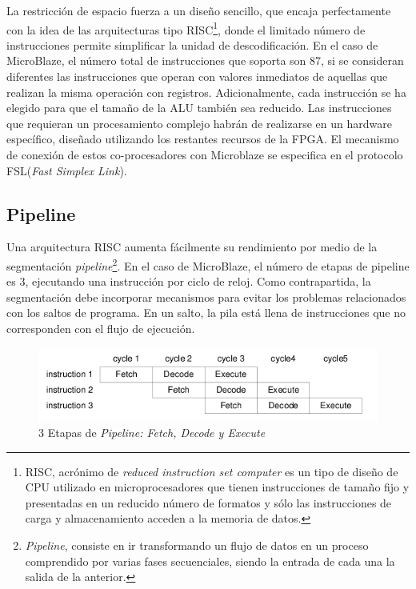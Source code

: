 La restricción de espacio fuerza a un diseño sencillo, que encaja perfectamente
con la idea de las arquitecturas tipo RISC\footnote{RISC, acrónimo de \emph{
reduced instruction set computer} es un tipo de diseño de CPU utilizado en
microprocesadores que tienen instrucciones de tamaño fijo y presentadas en un
reducido número de formatos y sólo las instrucciones de carga y almacenamiento
acceden a la memoria de datos.}, donde el limitado número de
instrucciones permite simplificar la unidad de descodificación. En el caso de
MicroBlaze, el número total de instrucciones que soporta son 87, si se
consideran diferentes las instrucciones que operan con valores inmediatos de
aquellas que realizan la misma operación con registros. Adicionalmente, cada
instrucción se ha elegido para que el tamaño de la ALU también sea reducido. Las
instrucciones que requieran un procesamiento complejo habrán de realizarse en un
hardware específico, diseñado utilizando los restantes recursos de la FPGA. El
mecanismo de conexión de estos co-procesadores con Microblaze se especifica en
el protocolo FSL(\emph{Fast Simplex Link}).

\subsection{Pipeline}


Una arquitectura RISC aumenta fácilmente su rendimiento por medio de la
segmentación \emph{pipeline}\footnote{\emph{Pipeline}, consiste en ir
transformando un flujo de datos en un proceso comprendido por varias fases
secuenciales, siendo la entrada de cada una la salida de la anterior.}. En el
caso de MicroBlaze, el número de etapas de pipeline es 3, ejecutando una
instrucción por ciclo de reloj. Como contrapartida, la segmentación debe
incorporar mecanismos para evitar los problemas relacionados con los saltos de
programa. En un salto, la pila está llena de instrucciones que no corresponden
con el flujo de ejecución.

\begin{figure}[h!]
 \centering
 \includegraphics[scale=.60]{./figuras/ciclo.png}
    \caption{3 Etapas de \emph{Pipeline: Fetch, Decode y Execute}}
 \label{Ciclo Fetch}
\end{figure}


